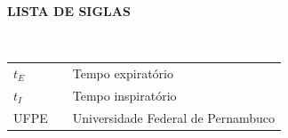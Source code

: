 \newpage

\begin{center}
\textbf{LISTA DE SIGLAS}
\end{center}
$\!$\\

\begin{tabular}{lll}
$t_E$ & \hspace{1cm} & Tempo expiratório \\
$t_I$ & \hspace{1cm} & Tempo inspiratório \\
UFPE & \hspace{1cm} & Universidade Federal de Pernambuco \\
\end{tabular}
